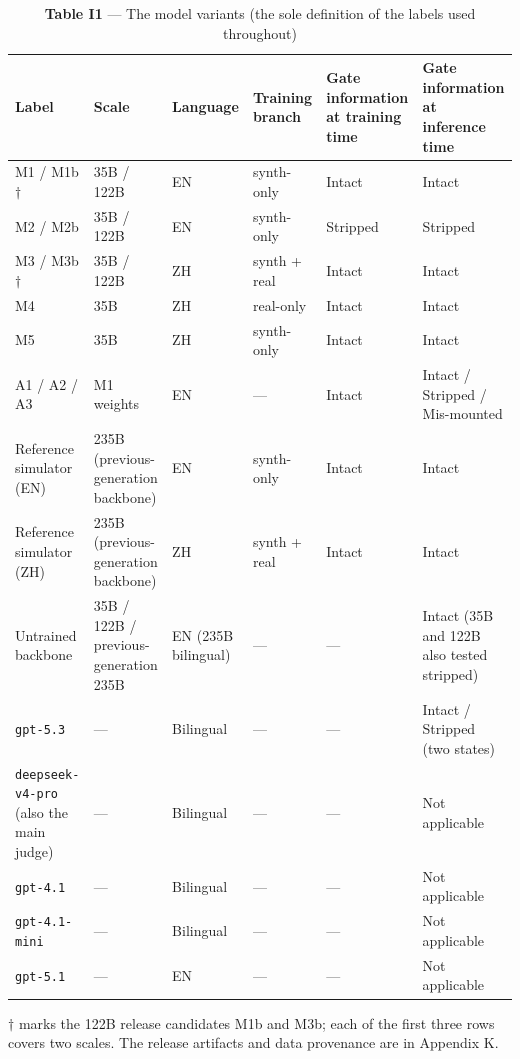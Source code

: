\documentclass[letterpaper]{article}
\begin{document}
\begin{table}[t]
\centering\footnotesize
\setlength{\tabcolsep}{4pt}
\caption{\textbf{Table I1} --- The model variants (the sole definition of the labels used throughout)}
\begin{tabular}{@{}>{\raggedright\arraybackslash}p{}>{\raggedright\arraybackslash}p{}>{\raggedright\arraybackslash}p{}>{\raggedright\arraybackslash}p{}>{\raggedright\arraybackslash}p{}>{\raggedright\arraybackslash}p{}@{}}
\toprule
Label & Scale & Language & Training branch & Gate information at training time & Gate information at inference time \\
\midrule
M1 / M1b $\dagger$ & 35B / 122B & EN & synth-only & Intact & Intact \\
M2 / M2b & 35B / 122B & EN & synth-only & Stripped & Stripped \\
M3 / M3b $\dagger$ & 35B / 122B & ZH & synth + real & Intact & Intact \\
M4 & 35B & ZH & real-only & Intact & Intact \\
M5 & 35B & ZH & synth-only & Intact & Intact \\
A1 / A2 / A3 & M1 weights & EN & --- & Intact & Intact / Stripped / Mis-mounted \\
Reference simulator (EN) & 235B (previous-generation backbone) & EN & synth-only & Intact & Intact \\
Reference simulator (ZH) & 235B (previous-generation backbone) & ZH & synth + real & Intact & Intact \\
Untrained backbone & 35B / 122B / previous-generation 235B & EN (235B bilingual) & --- & --- & Intact (35B and 122B also tested stripped) \\
\texttt{gpt-5.3} & --- & Bilingual & --- & --- & Intact / Stripped (two states) \\
\texttt{deepseek-v4-pro} (also the main judge) & --- & Bilingual & --- & --- & Not applicable \\
\texttt{gpt-4.1} & --- & Bilingual & --- & --- & Not applicable \\
\texttt{gpt-4.1-mini} & --- & Bilingual & --- & --- & Not applicable \\
\texttt{gpt-5.1} & --- & EN & --- & --- & Not applicable \\
\bottomrule
\end{tabular}
\end{table}

$\dagger$ marks the 122B release candidates M1b and M3b; each of the first three rows covers two scales. The release artifacts and data provenance are in Appendix K.
\end{document}
